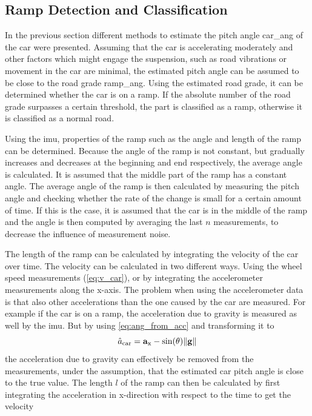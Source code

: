 \subsection{Ramp Detection and Classification}
\label{ssec:ramp_detection_imu}
In the previous section different methods to estimate the pitch angle \gls{car_ang} of the car were presented.
Assuming that the car is accelerating moderately and other factors which might engage the suspension, such as road vibrations or movement in the car are minimal, the estimated pitch angle can be assumed to be close to the road grade \gls{ramp_ang}.
Using the estimated road grade, it can be determined whether the car is on a ramp.
If the absolute number of the road grade surpasses a certain threshold, the part is classified as a ramp, otherwise it is classified as a normal road.\par
Using the \gls{imu}, properties of the ramp such as the angle and length of the ramp can be determined.
Because the angle of the ramp is not constant, but gradually increases and decreases at the beginning and end respectively, the average angle is calculated.
It is assumed that the middle part of the ramp has a constant angle.
The average angle of the ramp is then calculated by measuring the pitch angle and checking whether the rate of the change is small for a certain amount of time.
If this is the case, it is assumed that the car is in the middle of the ramp and the angle is then computed by averaging the last $n$ measurements, to decrease the influence of measurement noise.\par
The length of the ramp can be calculated by integrating the velocity of the car over time.
The velocity can be calculated in two different ways.
Using the wheel speed measurements (\cref{eq:v_car}), or by integrating the accelerometer measurements along the x-axis.
The problem when using the accelerometer data is that also other accelerations than the one caused by the car are measured.
For example if the car is on a ramp, the acceleration due to gravity is measured as well by the \gls{imu}.
But by using \cref{eq:ang_from_acc} and transforming it to
\begin{equation}
	\label{eq:acc_from_imu_wo_grav}
	\hat{a}_\mathrm{car} = \vb{a}_\mathrm{x} - \sin(\theta) \norm{\vb{g}}
\end{equation}
the acceleration due to gravity can effectively be removed from the measurements, under the assumption, that the estimated car pitch angle is close to the true value.
The length $l$ of the ramp can then be calculated by first integrating the acceleration in x-direction with respect to the time to get the velocity
